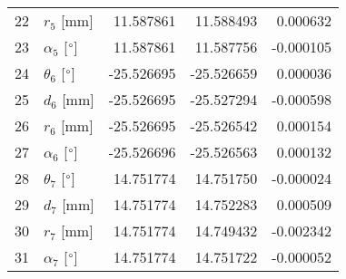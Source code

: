 \documentclass{standalone}%
\begin{document}
\begin{tabular}{llrrr}
22 &              $r_{5}$ [mm] &  11.587861 &  11.588493 &   0.000632 \\
23 &  $\alpha_{5}$ [$\degree$] &  11.587861 &  11.587756 &  -0.000105 \\
24 &  $\theta_{6}$ [$\degree$] & -25.526695 & -25.526659 &   0.000036 \\
25 &              $d_{6}$ [mm] & -25.526695 & -25.527294 &  -0.000598 \\
26 &              $r_{6}$ [mm] & -25.526695 & -25.526542 &   0.000154 \\
27 &  $\alpha_{6}$ [$\degree$] & -25.526696 & -25.526563 &   0.000132 \\
28 &  $\theta_{7}$ [$\degree$] &  14.751774 &  14.751750 &  -0.000024 \\
29 &              $d_{7}$ [mm] &  14.751774 &  14.752283 &   0.000509 \\
30 &              $r_{7}$ [mm] &  14.751774 &  14.749432 &  -0.002342 \\
31 &  $\alpha_{7}$ [$\degree$] &  14.751774 &  14.751722 &  -0.000052 \\
\bottomrule
\end{tabular}
%
\end{document}

